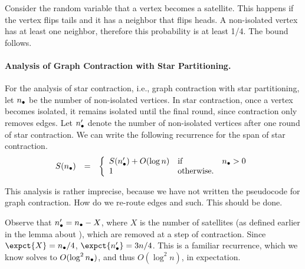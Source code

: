 {\begin{notesonly}
Consider the random variable that a vertex becomes a satellite.  This
happens if the vertex flips tails and it has a neighbor that flips
heads.  A non-isolated vertex has at least one neighbor, therefore
this probability is at least 1/4.  The bound follows.
\end{notesonly}








\paragraph{Analysis of Graph Contraction with Star Partitioning.}  
For the analysis of star contraction, i.e., graph contraction with
star partitioning, let $n_\bullet$ be the number of non-isolated vertices.
%
In star contraction, once a vertex becomes isolated, it remains
isolated until the final round, since contraction only removes edges.
%
Let $n_\bullet'$ denote the number of non-isolated vertices after one round of star
contraction.
%
We can write the following recurrence for the span of star contraction.
%
\[
\begin{array}{lll}
S(n_\bullet)  & = &
\left\{
\begin{array}{lll}
S(n_\bullet') + O(\log n) & \mbox{if} & n_\bullet > 0
\\
1 & \mbox{otherwise.}
\end{array}
\right.
\end{array}
\]
%

\begin{todo}
This analysis is rather imprecise, because we have not written the
pseudocode for graph contraction.  How do we re-route edges and such.
This should be done.
\end{todo}

Observe that $n_\bullet' = n_\bullet - X$, where $X$ is the number of satellites
(as defined earlier in the lemma about ), which are
removed at a step of contraction. Since $\expct{X} = \nn/4$,
$\expct{\nn'} = 3n/4$.
%
This is a familiar recurrence, which we know solves to $O(\log^2
n_\bullet)$, and thus $O(\log^2 n)$, in expectation.

}
